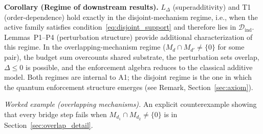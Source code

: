 \documentclass[11pt]{article}
\theoremstyle{remark}
\begin{document}
\begin{tcolorbox}[apfbox, title={Theorem $T_{\mathrm{sep}}$ (Separation Biconditional)}]
\smallskip\noindent\textbf{Corollary (Regime of downstream results).}  $L_\Delta$ (superadditivity) and T1 (order-dependence) hold exactly in the disjoint-mechanism regime, i.e., when the active family satisfies condition~\eqref{eq:disjoint_support} and therefore lies in $\mathcal{D}_{\mathrm{ind}}$.  Lemmas~P1--P4 (perturbation structure) provide additional characterization of this regime.  In the overlapping-mechanism regime ($M_d \cap M_{d'} \neq \{0\}$ for some pair), the budget sum overcounts shared substrate, the perturbation sets overlap, $\Delta \le 0$ is possible, and the enforcement algebra reduces to the classical additive model.  Both regimes are internal to A1; the disjoint regime is the one in which the quantum enforcement structure emerges (see Remark, Section~\ref{sec:axiom}).
\end{tcolorbox}

\smallskip\noindent\textit{Worked example (overlapping mechanisms).}  An explicit counterexample showing that every bridge step fails when $M_{d_1} \cap M_{d_2} \ne \{0\}$ is in Section~\ref{sec:overlap_detail}.
\end{document}
